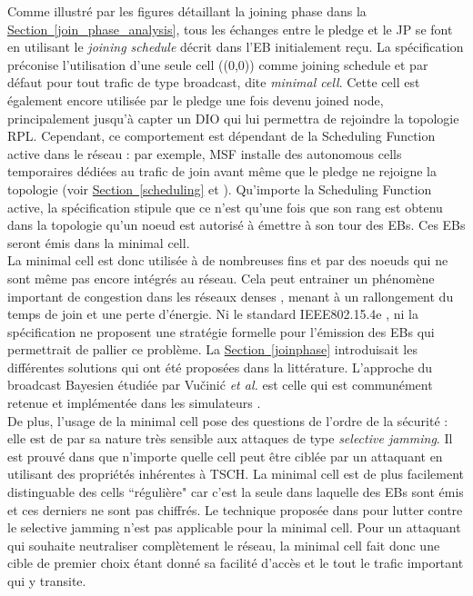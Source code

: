 \documentclass[]{report}
\newcommand{\wordlink}[2]{\hyperref[#2]{#1~\ref{#2}}}
\begin{document}
Comme illustré par les figures détaillant la joining phase dans la \wordlink{Section}{join_phase_analysis}, tous les échanges entre le pledge et le JP se font en utilisant le \textit{joining schedule} décrit dans l'EB initialement reçu. La spécification \cite{rfc8180} préconise l'utilisation d'une seule cell ((0,0)) comme joining schedule et par défaut pour tout trafic de type broadcast, dite \textit{minimal cell}. Cette cell est également encore utilisée par le pledge une fois devenu joined node, principalement jusqu'à capter un DIO qui lui permettra de rejoindre la topologie RPL. Cependant, ce comportement est dépendant de la Scheduling Function active dans le réseau : par exemple, MSF installe des autonomous cells temporaires dédiées au trafic de join avant même que le pledge ne rejoigne la topologie (voir \wordlink{Section}{scheduling} et \cite{ietf-6tisch-msf-10}). Qu'importe la Scheduling Function active, la spécification \cite{rfc8180} stipule que ce n'est qu'une fois que son rang est obtenu dans la topologie qu'un noeud est autorisé à émettre à son tour des EBs. Ces EBs seront émis dans la minimal cell.\\

La minimal cell est donc utilisée à de nombreuses fins et par des noeuds qui ne sont même pas encore intégrés au réseau. Cela peut entrainer un phénomène important de congestion dans les réseaux denses \cite{broadcast-strategies}, menant à un rallongement du temps de join et une perte d'énergie. Ni le standard IEEE802.15.4e \cite{IEEE802.15.4}, ni la spécification \cite{rfc8180} ne proposent une stratégie formelle pour l'émission des EBs qui permettrait de pallier ce problème. La \wordlink{Section}{joinphase} introduisait les différentes solutions qui ont été proposées dans la littérature. L'approche du broadcast Bayesien étudiée par Vučinić \textit{et al.} \cite{broadcast-strategies} est celle qui est communément retenue et implémentée dans les simulateurs \cite{simulating-6TiSCH}.\\

De plus, l'usage de la minimal cell pose des questions de l'ordre de la sécurité : elle est de par sa nature très sensible aux attaques de type \textit{selective jamming}. Il est prouvé dans \cite{tiloca-6tisch-robust-scheduling-02} que n'importe quelle cell peut être ciblée par un attaquant en utilisant des propriétés inhérentes à TSCH. La minimal cell est de plus facilement distinguable des cells ``régulière" car c'est la seule dans laquelle des EBs sont émis et ces derniers ne sont pas chiffrés. Le technique proposée dans \cite{tiloca-6tisch-robust-scheduling-02} pour lutter contre le selective jamming n'est pas applicable pour la minimal cell. Pour un attaquant qui souhaite neutraliser complètement le réseau, la minimal cell fait donc une cible de premier choix étant donné sa facilité d'accès et le tout le trafic important qui y transite.
\end{document}

